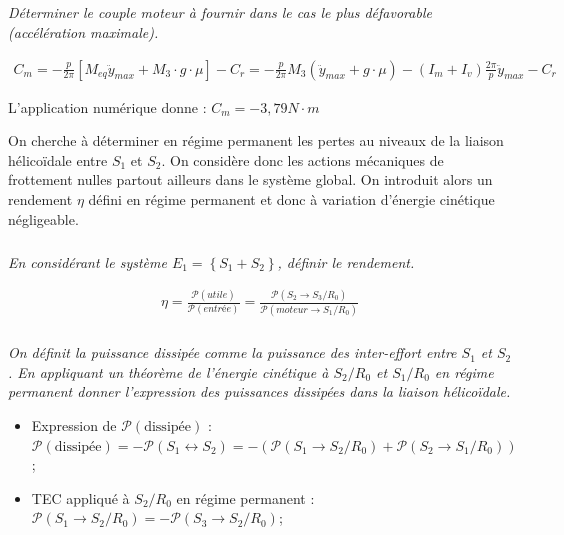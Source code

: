 \documentclass[10pt,fleqn]{article} %
\begin{document}
\begin{multicols}{2}
\subparagraph{}\textit{Déterminer le couple moteur à fournir dans le cas le plus défavorable (accélération maximale).}

\ifprof\begin{corrige}
\begin{align*}
C_m=-\frac{p}{2\pi}\left[M_{eq}\ddot{y}_{max}+M_3\cdot g\cdot \mu\right]-C_r
=-\frac{p}{2\pi}M_3\left(\ddot{y}_{max}+g\cdot \mu\right)-\left(I_m+I_v\right)\frac{2\pi}{p}\ddot{y}_{max}-C_r
\end{align*}

L'application numérique donne  : $C_m=-3,79N\cdot m$
\end{corrige}\else\fi




On cherche à déterminer en régime permanent les pertes au niveaux de la liaison hélicoïdale entre $S_1$ et $S_2$. On considère donc les actions mécaniques de frottement nulles partout ailleurs dans le système global. On introduit alors un rendement $\eta$ défini en régime permanent et donc à variation d'énergie cinétique négligeable.

\subparagraph{}\textit{En considérant le système $E_1=\left\{S_1+S_2\right\}$, définir le rendement.}

\ifprof\begin{corrige}
\begin{align*}
\eta=\frac{\mathcal{P}(utile)}{\mathcal{P}(entrée)}=\frac{\mathcal{P}(S_2\to S_3/R_0)}{\mathcal{P}(moteur\to S_1/R_0)}
\end{align*}
\end{corrige}\else\fi

\subparagraph{}\textit{On définit la puissance dissipée comme la puissance des inter-effort entre $S_1$ et $S_2$. En appliquant un théorème de l'énergie cinétique à $S_2/R_0$ et $S_1/R_0$ en régime permanent donner l'expression des puissances dissipées dans la liaison hélicoïdale.}

\ifprof\begin{corrige}
\begin{itemize}
\item Expression de $\mathcal{P}(\text{dissipée})$ :
$\mathcal{P}(\text{dissipée})=-\mathcal{P}(S_1\leftrightarrow S_2)=-\left(\mathcal{P}(S_1\to S_2/R_0)+\mathcal{P}(S_2\to S_1/R_0)\right)$;
\item TEC appliqué à $S_2/R_0$ en régime permanent : 
$\mathcal{P}(S_1\to S_2/R_0)=-\mathcal{P}(S_3\to S_2/R_0)$;


\end{itemize}
\end{corrige}
\end{multicols}
\end{document}

